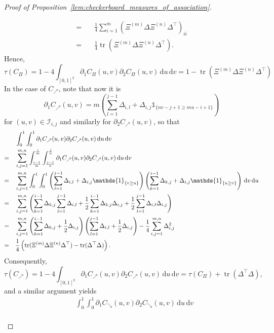 \documentclass{article}
\theoremstyle{definition}
\newcommand{\II}{\mathcal{I}}  %
\DeclareMathOperator{\tr}{tr}  %
\def\1{\mathds{1}} %
\newcommand{\de}{\mathrm{\,d}}
\begin{document}
\begin{proof}[Proof of Proposition~\ref{lem:checkerboard_measures_of_association}]
\begin{enumerate}[label=(\roman*)]
\begin{align*}
            = \quad & \frac14 \sum_{i=1}^{m} \left(\Xi^{(m)} \Delta \Xi^{(n)} \Delta^\top\right)_{ii} \\
            = \quad & \frac14 \tr\left(\Xi^{(m)} \Delta \Xi^{(n)} \Delta^\top\right)
        .\end{align*}
        Hence,
        \[
            \tau(C_{\Pi})
            = 1 - 4 \int_{[0,1]^2} \partial_1 C_{\Pi}(u,v) \partial_2 C_{\Pi}(u,v) \de u \de v
            = 1 - \tr\left(\Xi^{(m)} \Delta \Xi^{(n)} \Delta^\top\right)
        \]
        In the case of $C_{\nearrow}$, note that now it is
        \[
            \partial_1 C_{\nearrow}(u,v) 
            =m\left(\sum_{l=1}^{j-1}\Delta_{i,l} + \Delta_{i,j}\1_{\{nv-j+1\geq mu-i + 1\}}\right)
        \]
        for $(u,v)\in\II_{i,j}$ and similarly for $\partial_2 C_{\nearrow}(u,v)$, so that
        \begin{align*}
            &\int_0^1\int_0^1 \partial_1 C_{\nearrow}(u,v) \partial_2 C_{\nearrow}(u,v) \de u \de v \\
            = \quad & \sum_{i,j=1}^{m,n} \int_{\frac{i-1}m}^{\frac{i}m} \int_{\frac{j-1}n}^{\frac{j}n} \partial_1 C_{\nearrow}(u,v) \partial_2 C_{\nearrow}(u,v) \de u \de v \\
            = \quad & \sum_{i,j=1}^{m,n} \int_{0}^{1}\int_{0}^{1} \left( \sum_{l=1}^{j-1} \Delta_{i,l} + \Delta_{i,j} \1_{\{v\geq u\}} \right) \left(\sum_{k=1}^{i-1} \Delta_{k,j} + \Delta_{i,j} \1_{\{u\geq v\}}\right) \de v \de u \allowdisplaybreaks\\
            = \quad & \sum_{i,j=1}^{m,n} \left(\sum_{k=1}^{i-1} \Delta_{k,j}\sum_{l=1}^{j-1} \Delta_{i,l} + \frac12\sum_{k=1}^{i-1} \Delta_{k,j}\Delta_{i,j} + \frac12\sum_{l=1}^{j-1} \Delta_{i,l} \Delta_{i,j}\right) \allowdisplaybreaks\\
            = \quad & \sum_{i,j=1}^{m,n} \left(\sum_{k=1}^{i-1} \Delta_{k,j} + \frac12 \Delta_{i,j}\right)\left(\sum_{l=1}^{j-1} \Delta_{i,l} + \frac12 \Delta_{i,j}\right) - \frac14 \sum_{i,j=1}^{m,n} \Delta_{i,j}^2 \\
            = \quad & \frac14\left( \tr(\Xi^{(m)} \Delta \Xi^{(n)} \Delta^\top) - \tr(\Delta^\top \Delta)\right)
        .\end{align*}
        Consequently,
        \[
            \tau(C_{\nearrow}) = 1 - 4\int_{[0,1]^2} \partial_1 C_{\nearrow}(u,v)\partial_2 C_{\nearrow}(u,v) \de u\de v
            = \tau(C_{\Pi}) + \tr(\Delta^\top \Delta)
        ,\]
        and a similar argument yields
        \begin{align*}
            &\int_0^1\int_0^1 \partial_1 C_{\searrow}(u,v) \partial_2 C_{\searrow}(u,v) \de u \de v \\

\end{align*}
\end{enumerate}
\end{proof}
\end{document}
